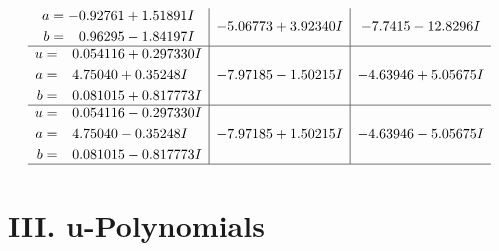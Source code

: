 \documentclass[1p]{elsarticle_modified}
\theoremstyle{definition}
\begin{document}
$$\begin{array}{c|c|c}
\begin{aligned}
a &= -0.92761 + 1.51891 I \\
b &= \phantom{-}0.96295 - 1.84197 I\end{aligned}
 & -5.06773 + 3.92340 I & -7.7415 - 12.8296 I \\ \hline\begin{aligned}
u &= \phantom{-}0.054116 + 0.297330 I \\
a &= \phantom{-}4.75040 + 0.35248 I \\
b &= \phantom{-}0.081015 + 0.817773 I\end{aligned}
 & -7.97185 - 1.50215 I & -4.63946 + 5.05675 I \\ \hline\begin{aligned}
u &= \phantom{-}0.054116 - 0.297330 I \\
a &= \phantom{-}4.75040 - 0.35248 I \\
b &= \phantom{-}0.081015 - 0.817773 I\end{aligned}
 & -7.97185 + 1.50215 I & -4.63946 - 5.05675 I\\
 \hline 
 \end{array}$$\newpage
\newpage\renewcommand{\arraystretch}{1}
\centering \section*{ III. u-Polynomials}
\end{document}
